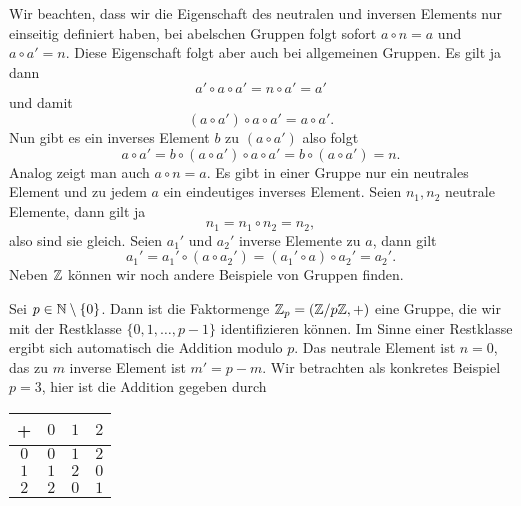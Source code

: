 Wir beachten, dass wir die Eigenschaft des neutralen und inversen Elements nur einseitig definiert haben, bei abelschen Gruppen folgt sofort \(a \circ n = a\) und \(a \circ a'=n\). Diese Eigenschaft folgt aber auch bei allgemeinen Gruppen. Es gilt ja dann
\begin{equation*}
a' \circ a  \circ a' = n \circ a' = a'
\end{equation*}
und damit
\begin{equation*}
(a \circ a') \circ a \circ a' = a \circ a' .
\end{equation*}
Nun gibt es ein inverses Element \(b\) zu \((a \circ a')\) also folgt
\begin{equation*}
a \circ a' = b \circ (a \circ a') \circ a \circ a' = b \circ (a \circ a') = n.
\end{equation*}
Analog zeigt man auch \(a \circ n = a\).
Es gibt in einer Gruppe nur ein neutrales Element und zu jedem \(a\) ein eindeutiges inverses Element. Seien \(n_1,n_2\) neutrale Elemente, dann gilt ja
\begin{equation*}
n_1 = n_1 \circ n_2 = n_2,
\end{equation*}
also sind sie gleich. Seien \(a_1'\) und \(a_2'\) inverse Elemente zu \(a\), dann gilt
\begin{equation*}
a_1' = a_1' \circ (a \circ a_2') = (a_1' \circ a) \circ a_2' = a_2'.
\end{equation*}
Neben \(\mathbb{Z}\) können wir noch andere Beispiele von Gruppen finden.
\label{grundlagen/zahlensysteme:example-5}
\begin{example}{}{}



Sei \(p \in \mathbb{N} \setminus \{0\}\). Dann ist die Faktormenge \(\mathbb{Z}_p = (\mathbb{Z}/p\mathbb{Z}, +)\) eine Gruppe, die wir mit der Restklasse
\( \{0,1,\ldots,p-1\}\) identifizieren können. Im Sinne einer Restklasse ergibt sich automatisch die Addition modulo \(p\). Das neutrale Element ist \(n=0\), das zu \(m\) inverse Element ist \(m'=p-m\). Wir betrachten als konkretes Beispiel \(p=3\), hier ist die Addition gegeben durch


\begin{center}
\centering
\begin{tabularx}{\linewidth}[{\linewidth}]{|c|c|c|c|}\hline
 
+
& 
\(0\)
& 
\(1\)
& 
\(2\)
\\
\hline
\(0\)
&
\(0\)
&
\(1\)
&
\(2\)
\\
\hline
\(1\)
&
\(1\)
&
\(2\)
&
\(0\)
\\
\hline
\(2\)
&
\(2\)
&
\(0\)
&
\(1\)
\\
\hline
\end{tabularx}
\end{center}
\end{example}

